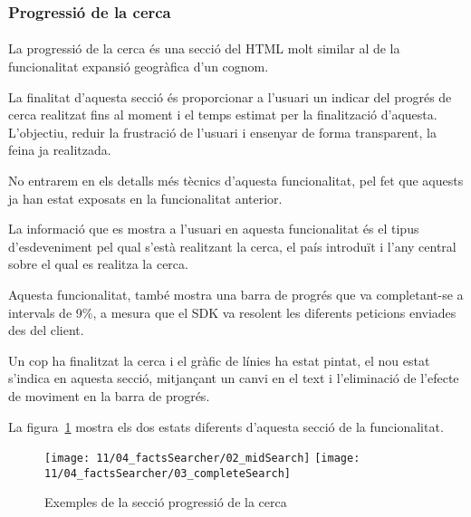 \subsubsection{Progressió de la cerca}

\paragraph{}
La progressió de la cerca és una secció del HTML molt similar al de la funcionalitat expansió geogràfica d’un cognom.

La finalitat d'aquesta secció és proporcionar a l'usuari un indicar del progrés de cerca realitzat fins al moment i el temps estimat per la finalització d'aquesta. L'objectiu, reduir la frustració de l'usuari i ensenyar de forma transparent, la feina ja realitzada.

No entrarem en els detalls més tècnics d'aquesta funcionalitat, pel fet que aquests ja han estat exposats en la funcionalitat anterior.

La informació que es mostra a l'usuari en aquesta funcionalitat és el tipus d'esdeveniment pel qual s'està realitzant la cerca, el país introduït i l'any central sobre el qual es realitza la cerca.

Aquesta funcionalitat, també mostra una barra de progrés que va completant-se a intervals de 9\%, a mesura que el SDK va resolent les diferents peticions enviades des del client.

Un cop ha finalitzat la cerca i el gràfic de línies ha estat pintat, el nou estat s'indica en aquesta secció, mitjançant un canvi en el text i l’eliminació de l'efecte de moviment en la barra de progrés.

La figura~\ref{fig:waitingFacts} mostra els dos estats diferents d'aquesta secció de la funcionalitat.

\begin{figure}
    \texttt{[image: 11/04\_factsSearcher/02\_midSearch]}
    \texttt{[image: 11/04\_factsSearcher/03\_completeSearch]}
    \centering
    \caption{Exemples de la secció progressió de la cerca}\label{fig:waitingFacts}
\end{figure}
